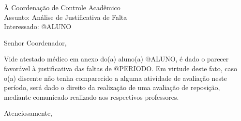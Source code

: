 


\hspace{1.4cm}




\noindent À Coordenação de Controle Acadêmico\\
Assunto: Análise de Justificativa de Falta\\
Interessado: @ALUNO

\noindent Senhor Coordenador,

\onehalfspacing Vide atestado médico em anexo do(a) aluno(a) @ALUNO, é dado o parecer favorável à justificativa das faltas de @PERIODO. Em virtude deste fato, caso o(a) discente não tenha comparecido a alguma atividade de avaliação neste período, será dado o direito da realização de uma avaliação de reposição, mediante comunicado realizado aos respectivos professores.

\noindent Atenciosamente,




